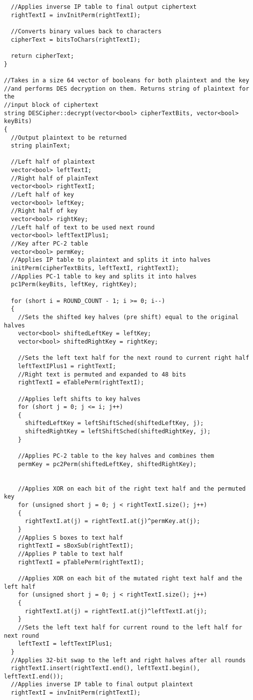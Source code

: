 \documentclass[11pt]{article}
\begin{document}
\begin{verbatim}
  //Applies inverse IP table to final output ciphertext
  rightTextI = invInitPerm(rightTextI);

  //Converts binary values back to characters
  cipherText = bitsToChars(rightTextI);

  return cipherText;
}

//Takes in a size 64 vector of booleans for both plaintext and the key
//and performs DES decryption on them. Returns string of plaintext for the
//input block of ciphertext
string DESCipher::decrypt(vector<bool> cipherTextBits, vector<bool> keyBits)
{
  //Output plaintext to be returned
  string plainText;

  //Left half of plaintext
  vector<bool> leftTextI;
  //Right half of plainText
  vector<bool> rightTextI;
  //Left half of key
  vector<bool> leftKey;
  //Right half of key
  vector<bool> rightKey;
  //Left half of text to be used next round
  vector<bool> leftTextIPlus1;
  //Key after PC-2 table
  vector<bool> permKey;
  //Applies IP table to plaintext and splits it into halves
  initPerm(cipherTextBits, leftTextI, rightTextI);
  //Applies PC-1 table to key and splits it into halves
  pc1Perm(keyBits, leftKey, rightKey);

  for (short i = ROUND_COUNT - 1; i >= 0; i--)
  {
    //Sets the shifted key halves (pre shift) equal to the original halves
    vector<bool> shiftedLeftKey = leftKey;
    vector<bool> shiftedRightKey = rightKey;

    //Sets the left text half for the next round to current right half
    leftTextIPlus1 = rightTextI;
    //Right text is permuted and expanded to 48 bits
    rightTextI = eTablePerm(rightTextI);

    //Applies left shifts to key halves
    for (short j = 0; j <= i; j++)
    {
      shiftedLeftKey = leftShiftSched(shiftedLeftKey, j);
      shiftedRightKey = leftShiftSched(shiftedRightKey, j);
    }

    //Applies PC-2 table to the key halves and combines them
    permKey = pc2Perm(shiftedLeftKey, shiftedRightKey);


    //Applies XOR on each bit of the right text half and the permuted key
    for (unsigned short j = 0; j < rightTextI.size(); j++)
    {
      rightTextI.at(j) = rightTextI.at(j)^permKey.at(j);
    }
    //Applies S boxes to text half
    rightTextI = sBoxSub(rightTextI);
    //Applies P table to text half
    rightTextI = pTablePerm(rightTextI);

    //Applies XOR on each bit of the mutated right text half and the left half
    for (unsigned short j = 0; j < rightTextI.size(); j++)
    {
      rightTextI.at(j) = rightTextI.at(j)^leftTextI.at(j);
    }
    //Sets the left text half for current round to the left half for next round
    leftTextI = leftTextIPlus1;
  }
  //Applies 32-bit swap to the left and right halves after all rounds
  rightTextI.insert(rightTextI.end(), leftTextI.begin(), leftTextI.end());
  //Applies inverse IP table to final output plaintext
  rightTextI = invInitPerm(rightTextI);


\end{verbatim}
\end{document}
